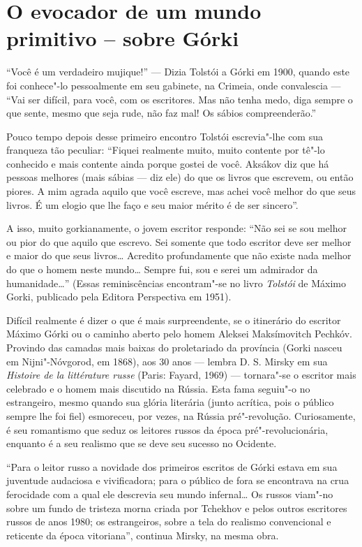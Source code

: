 \chapter{O evocador de um mundo primitivo -- sobre Górki}

``Você é um verdadeiro mujique!'' --- Dizia Tolstói a Górki em 1900,
quando este foi conhece"-lo pessoalmente em seu gabinete, na Crimeia, onde convalescia --- ``Vai ser
difícil, para você, com os escritores. Mas não tenha medo, diga sempre o
que sente, mesmo que seja rude, não faz mal! Os sábios compreenderão.''

Pouco tempo depois desse primeiro encontro Tolstói escrevia"-lhe com sua
franqueza tão peculiar: ``Fiquei realmente muito, muito contente por
tê"-lo conhecido e mais contente ainda porque gostei de você. Aksákov diz
que há pessoas melhores (mais sábias --- diz ele) do que os livros que
escrevem, ou então piores. A mim agrada aquilo que você escreve, mas
achei você melhor do que seus livros. É um elogio que lhe faço e seu
maior mérito é de ser sincero''.

A isso, muito gorkianamente, o jovem escritor responde: ``Não sei se sou
melhor ou pior do que aquilo que escrevo. Sei somente que todo escritor
deve ser melhor e maior do que seus livros\ldots{} Acredito profundamente que
não existe nada melhor do que o homem neste mundo\ldots{} Sempre fui, sou e
serei um admirador da humanidade\ldots{}'' (Essas reminiscências
encontram"-se no livro \emph{Tolstói} de Máximo Gorki, publicado pela
Editora Perspectiva em 1951).

Difícil realmente é dizer o que é mais surpreendente, se o itinerário do
escritor Máximo Górki ou o caminho aberto pelo homem Aleksei
Maksímovitch Pechkóv. Provindo das camadas mais baixas do proletariado
da província (Gorki nasceu em Nijni"-Nóvgorod, em 1868), aos 30 anos --- lembra
D. S. Mirsky em sua \emph{Histoire de la littérature russe} (Paris: Fayard, 1969) --- tornara"-se o
escritor mais celebrado e o homem mais discutido na Rússia. Esta fama
seguiu"-o no estrangeiro, mesmo quando sua glória literária (junto
acrítica, pois o público sempre lhe foi fiel) esmoreceu, por vezes, na
Rússia pré"-revolução. Curiosamente, é seu romantismo que seduz os
leitores russos da época pré"-revolucionária, enquanto é a seu realismo
que se deve seu sucesso no Ocidente.

``Para o leitor russo a novidade dos primeiros escritos de Górki estava
em sua juventude audaciosa e vivificadora; para o público de fora se
encontrava na crua ferocidade com a qual ele descrevia seu mundo
infernal\ldots{} Os russos viam"-no sobre um fundo de tristeza morna criada
por Tchekhov e pelos outros escritores russos de anos 1980; os
estrangeiros, sobre a tela do realismo convencional e reticente da época
vitoriana'', continua Mirsky, na mesma obra.

